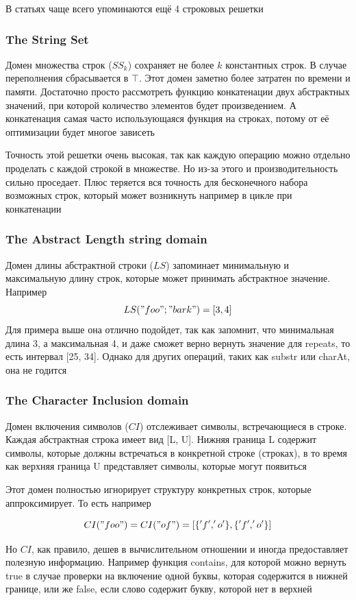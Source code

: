 В статьях чаще всего упоминаются ещё 4 строковых решетки

\subsubsection*{The String Set}
Домен множества строк ($SS_k$) сохраняет не более $k$ константных строк. В случае переполнения сбрасывается в $\top$. Этот домен заметно более затратен по времени и памяти. Достаточно просто рассмотреть функцию конкатенации двух абстрактных значений, при которой количество элементов будет произведением. А конкатенация самая часто использующаяся функция на строках, потому от её оптимизации будет многое зависеть

Точность этой решетки очень высокая, так как каждую операцию можно отдельно проделать с каждой строкой в множестве. Но из-за этого и производительность сильно проседает. Плюс теряется вся точность для бесконечного набора возможных строк, который может возникнуть например в цикле при конкатенации

\subsubsection*{The Abstract Length string domain}
Домен длины абстрактной строки ($LS$) запоминает минимальную и максимальную длину строк, которые может принимать абстрактное значение. Например
$$LS("foo"; "bark") = [3, 4] $$
Для примера выше она отлично подойдет, так как запомнит, что минимальная длина 3, а максимальная 4, и даже сможет верно вернуть значение для repeats, то есть интервал [25, 34]. Однако для других операций, таких как substr или charAt, она не годится

\subsubsection*{The Character Inclusion domain}
Домен включения символов ($CI$) отслеживает символы, встречающиеся в строке. Каждая абстрактная строка имеет вид [L, U]. Нижняя граница L содержит символы, которые должны встречаться в конкретной строке (строках), в то время как верхняя граница U представляет символы, которые могут появиться

Этот домен полностью игнорирует структуру конкретных строк, которые аппроксимирует. То есть например 

$$CI("foo") = CI("of") = [\{'f', 'o'\}, \{'f', 'o'\}]$$

Но $CI$, как правило, дешев в вычислительном отношении и иногда предоставляет полезную информацию. Например функция contains, для которой можно вернуть true в случае проверки на включение одной буквы, которая содержится в нижней границе, или же false, если слово содержит букву, которой нет в верхней

